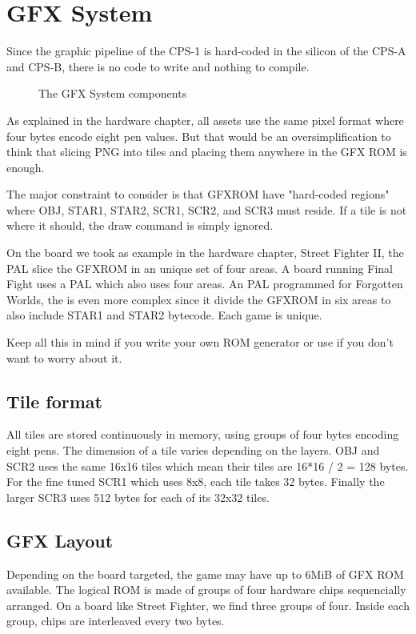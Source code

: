 \chapter{GFX System}
Since the graphic pipeline of the CPS-1 is hard-coded in the silicon of the CPS-A and CPS-B, there is no code to write and nothing to compile. 

\begin{figure}[H]
\caption*{The GFX System components}
\end{figure}

As explained in the hardware chapter, all assets use the same pixel format where four bytes encode eight pen values. But that would be an oversimplification to think that slicing PNG into tiles and placing them anywhere in the GFX ROM is enough.

The major constraint to consider is that GFXROM have "hard-coded regions" where OBJ, STAR1, STAR2, SCR1, SCR2, and SCR3 must reside. If a tile is not where it should, the draw command is simply ignored.

On the board we took as example in the hardware chapter, Street Fighter II, the  PAL slice the GFXROM in an unique set of four areas. A board running Final Fight uses a  PAL which also uses four areas. An PAL programmed for Forgotten Worlds, the  is even more complex since it divide the GFXROM in six areas to also include STAR1 and STAR2 bytecode. Each game is unique. 

Keep all this in mind if you write your own ROM generator or use  if you don't want to worry about it.

\section{Tile format}
All tiles are stored continuously in memory, using groups of four bytes encoding eight pens. The dimension of a tile varies depending on the layers. OBJ and SCR2 uses the same 16x16 tiles which mean their tiles are 16*16 / 2 = 128 bytes. For the fine tuned SCR1 which uses 8x8, each tile takes 32 bytes. Finally the larger SCR3 uses 512 bytes for each of its 32x32 tiles.

\section{GFX Layout}
Depending on the board targeted, the game may have up to 6MiB of GFX ROM available. The logical ROM is made of groups of four hardware chips sequencially arranged. On a board like Street Fighter, we find three groups of four. Inside each group, chips are interleaved every two bytes.

